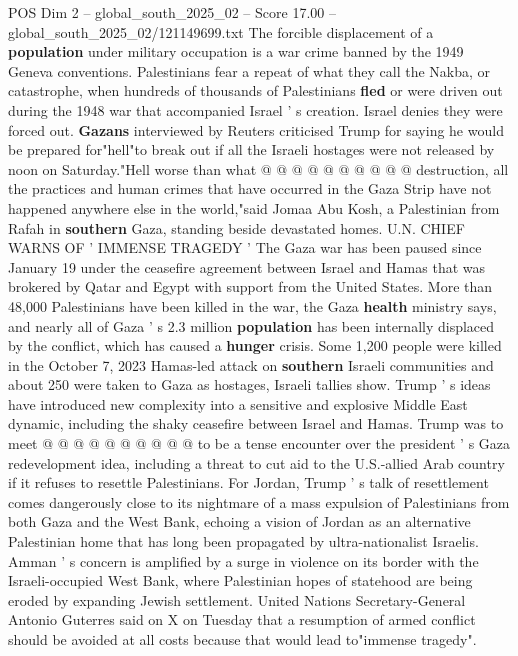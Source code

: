 \begin{textsample}{POS Dim 2 – global\_south\_2025\_02 – Score 17.00 – global\_south\_2025\_02/121149699.txt}
The forcible displacement of a \textbf{population} under military occupation is a war crime banned by the 1949 Geneva conventions.
Palestinians fear a repeat of what they call the Nakba, or catastrophe, when hundreds of thousands of Palestinians \textbf{fled} or were driven out during the 1948 war that accompanied Israel ' s creation.
Israel denies they were forced out. \textbf{Gazans} interviewed by Reuters criticised Trump for saying he would be prepared for"hell"to break out if all the Israeli hostages were not released by noon on Saturday."Hell worse than what @ @ @ @ @ @ @ @ @ @ destruction, all the practices and human crimes that have occurred in the Gaza Strip have not happened anywhere else in the world,"said Jomaa Abu Kosh, a Palestinian from Rafah in \textbf{southern} Gaza, standing beside devastated homes.
U.N.
CHIEF WARNS OF ' IMMENSE TRAGEDY ' The Gaza war has been paused since January 19 under the ceasefire agreement between Israel and Hamas that was brokered by Qatar and Egypt with support from the United States.
More than 48,000 Palestinians have been killed in the war, the Gaza \textbf{health} ministry says, and nearly all of Gaza ' s 2.3 million \textbf{population} has been internally displaced by the conflict, which has caused a \textbf{hunger} crisis.
Some 1,200 people were killed in the October 7, 2023 Hamas-led attack on \textbf{southern} Israeli communities and about 250 were taken to Gaza as hostages, Israeli tallies show.
Trump ' s ideas have introduced new complexity into a sensitive and explosive Middle East dynamic, including the shaky ceasefire between Israel and Hamas.
Trump was to meet @ @ @ @ @ @ @ @ @ @ to be a tense encounter over the president ' s Gaza redevelopment idea, including a threat to cut aid to the U.S.-allied Arab country if it refuses to resettle Palestinians.
For Jordan, Trump ' s talk of resettlement comes dangerously close to its nightmare of a mass expulsion of Palestinians from both Gaza and the West Bank, echoing a vision of Jordan as an alternative Palestinian home that has long been propagated by ultra-nationalist Israelis.
Amman ' s concern is amplified by a surge in violence on its border with the Israeli-occupied West Bank, where Palestinian hopes of statehood are being eroded by expanding Jewish settlement.
United Nations Secretary-General Antonio Guterres said on X on Tuesday that a resumption of armed conflict should be avoided at all costs because that would lead to"immense tragedy".

\end{textsample}
